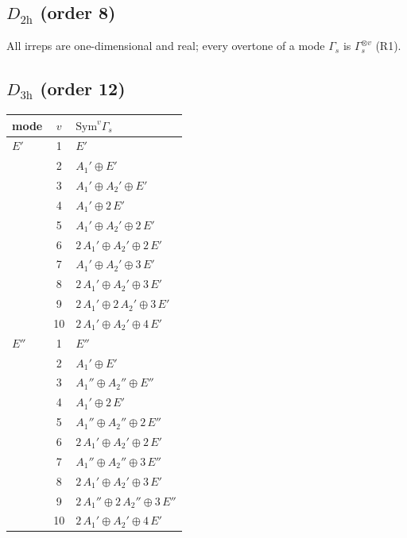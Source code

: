 \documentclass[11pt]{article}
\begin{document}
\subsection*{$D_{2\mathrm{h}}$ \quad (order 8)}
All irreps are one-dimensional and real; every overtone of a mode $\Gamma_s$ is $\Gamma_s^{\otimes v}$ (R1).

\subsection*{$D_{3\mathrm{h}}$ \quad (order 12)}
\begin{longtable}{l c p{}}
\hline mode & $v$ & $\mathrm{Sym}^v\Gamma_s$\\ \hline\endhead
$E'$ & 1 & $E'$\\
 & 2 & $A_{1}'\oplus E'$\\
 & 3 & $A_{1}'\oplus A_{2}'\oplus E'$\\
 & 4 & $A_{1}'\oplus 2\,E'$\\
 & 5 & $A_{1}'\oplus A_{2}'\oplus 2\,E'$\\
 & 6 & $2\,A_{1}'\oplus A_{2}'\oplus 2\,E'$\\
 & 7 & $A_{1}'\oplus A_{2}'\oplus 3\,E'$\\
 & 8 & $2\,A_{1}'\oplus A_{2}'\oplus 3\,E'$\\
 & 9 & $2\,A_{1}'\oplus 2\,A_{2}'\oplus 3\,E'$\\
 & 10 & $2\,A_{1}'\oplus A_{2}'\oplus 4\,E'$\\
\hline
$E''$ & 1 & $E''$\\
 & 2 & $A_{1}'\oplus E'$\\
 & 3 & $A_{1}''\oplus A_{2}''\oplus E''$\\
 & 4 & $A_{1}'\oplus 2\,E'$\\
 & 5 & $A_{1}''\oplus A_{2}''\oplus 2\,E''$\\
 & 6 & $2\,A_{1}'\oplus A_{2}'\oplus 2\,E'$\\
 & 7 & $A_{1}''\oplus A_{2}''\oplus 3\,E''$\\
 & 8 & $2\,A_{1}'\oplus A_{2}'\oplus 3\,E'$\\
 & 9 & $2\,A_{1}''\oplus 2\,A_{2}''\oplus 3\,E''$\\
 & 10 & $2\,A_{1}'\oplus A_{2}'\oplus 4\,E'$\\
\hline
\end{longtable}
\end{document}
